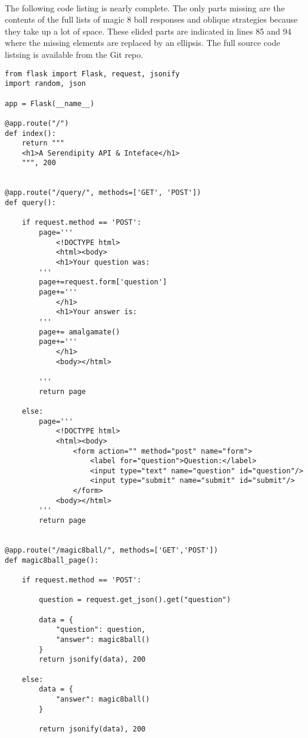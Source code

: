 \paragraph{} The following code listing is nearly complete. The only parts missing are the contents of the full lists of magic 8 ball responses and oblique strategies because they take up a lot of space. These elided parts are indicated in lines 85 and 94 where the missing elements are replaced by an ellipsis. The full source code listsing is available from the Git repo.

\begin{lstlisting}
from flask import Flask, request, jsonify
import random, json

app = Flask(__name__)

@app.route("/")
def index():
    return """
    <h1>A Serendipity API & Inteface</h1>
    """, 200    


@app.route("/query/", methods=['GET', 'POST'])
def query():

    if request.method == 'POST':
        page='''
            <!DOCTYPE html>
            <html><body>
            <h1>Your question was:
        '''
        page+=request.form['question']
        page+='''
            </h1>
            <h1>Your answer is:
        '''
        page+= amalgamate()
        page+='''
            </h1>
            <body></html>

        '''        
        return page
        
    else:
        page='''
            <!DOCTYPE html>
            <html><body>
                <form action="" method="post" name="form">
                    <label for="question">Question:</label>
                    <input type="text" name="question" id="question"/>
                    <input type="submit" name="submit" id="submit"/>
                </form>
            <body></html>
        '''
        return page


@app.route("/magic8ball/", methods=['GET','POST'])
def magic8ball_page():

    if request.method == 'POST':

        question = request.get_json().get("question")
        
        data = {
            "question": question,
            "answer": magic8ball()
        }
        return jsonify(data), 200

    else:
        data = {
            "answer": magic8ball()
        }

        return jsonify(data), 200



\end{lstlisting}

